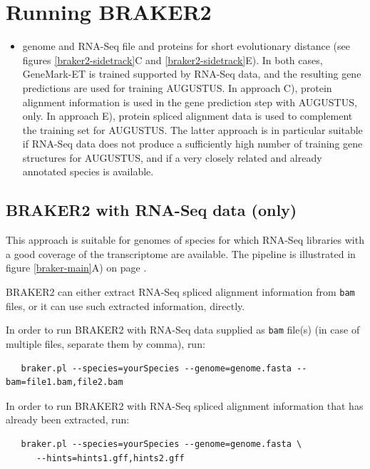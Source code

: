 \documentclass[a4paper,10pt]{report}
\begin{document}
\chapter{Running BRAKER2}


\begin{itemize}
 \item genome and RNA-Seq file and proteins for short evolutionary distance (see figures \ref{braker2-sidetrack}C and \ref{braker2-sidetrack}E). In both cases, GeneMark-ET is trained supported by RNA-Seq data, and the resulting gene predictions are used for training AUGUSTUS. In approach C), protein alignment information is used in the gene prediction step with AUGUSTUS, only. In approach E), protein spliced alignment data is used to complement the training set for AUGUSTUS. The latter approach is in particular suitable if RNA-Seq data does not produce a sufficiently high number of training gene structures for AUGUSTUS, and if a very closely related and already annotated species is available.
\end{itemize}

\section{BRAKER2 with RNA-Seq data (only)}

This approach is suitable for genomes of species for which RNA-Seq libraries with a good coverage of the transcriptome are available. The pipeline is illustrated in figure \ref{braker-main}A) on page \pageref{braker-main}.

BRAKER2 can either extract RNA-Seq spliced alignment information from \texttt{bam} files, or it can use such extracted information, directly.

In order to run BRAKER2 with RNA-Seq data supplied as \texttt{bam} file(s) (in case of multiple files, separate them by comma), run:

\begin{verbatim}
   braker.pl --species=yourSpecies --genome=genome.fasta --bam=file1.bam,file2.bam
\end{verbatim}

In order to run BRAKER2 with RNA-Seq spliced alignment information that has already been extracted, run:

\begin{verbatim}
   braker.pl --species=yourSpecies --genome=genome.fasta \
      --hints=hints1.gff,hints2.gff
\end{verbatim}
\end{document}
